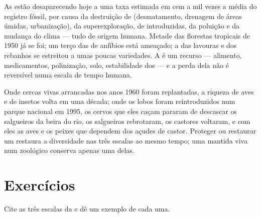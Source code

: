 \begin{proposition}\label{prop:g10:biodiversity-scales:present}
As  estão desaparecendo hoje a uma taxa estimada em cem a mil
vezes a média do registro fóssil, por causa da destruição de
 (desmatamento, drenagem de áreas úmidas, urbanização), da
superexploração, de  introduzidas, da poluição e da mudança do
clima --- tudo de origem humana. Metade das florestas tropicais de 1950
já se foi; um terço das  de anfíbios está ameaçado; a
 das lavouras e dos rebanhos se estreitou a umas
poucas variedades. A  é um recurso --- alimento,
medicamentos, polinização, solo, estabilidade dos  --- e a
perda dela não é reversível numa escala de tempo humana.
\end{proposition}
\admitted

\begin{example}\label{ex:g10:biodiversity-scales:reversing}
Onde cercas vivas arrancadas nos anos 1960 foram replantadas, a riqueza
de aves e de insetos volta em uma década; onde os lobos foram
reintroduzidos num parque nacional em 1995, os cervos que eles caçam
pararam de descascar os salgueiros da beira do rio, os salgueiros
rebrotaram, os castores voltaram, e com eles as aves e os peixes que
dependem dos açudes de castor. Proteger ou restaurar um 
restaura a diversidade nas três escalas ao mesmo tempo; uma 
mantida viva num zoológico conserva apenas uma delas.
\end{example}

\section{Exercícios}

\begin{exercise}[$\star$]\label{exo:g10:biodiversity-scales:1}
Cite as três escalas da  e dê um exemplo de cada uma.
\end{exercise}

